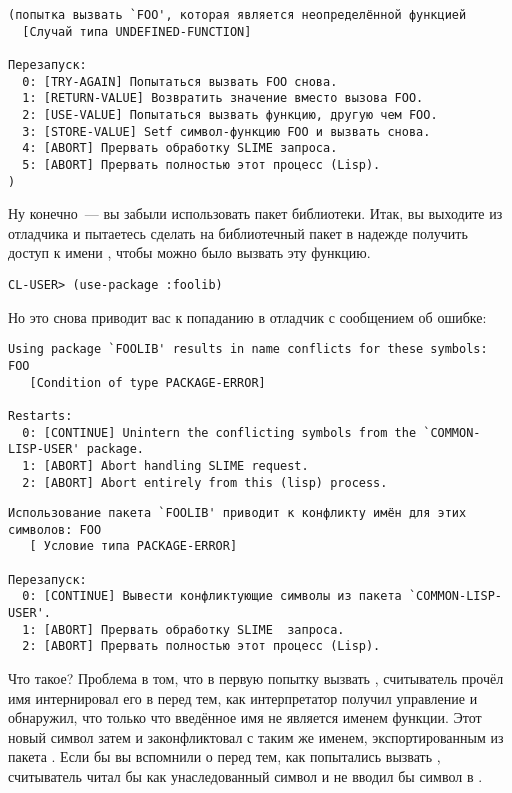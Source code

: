 \begin{verbatim}
(попытка вызвать `FOO', которая является неопределённой функцией
  [Случай типа UNDEFINED-FUNCTION]

Перезапуск:
  0: [TRY-AGAIN] Попытаться вызвать FOO снова.
  1: [RETURN-VALUE] Возвратить значение вместо вызова FOO.
  2: [USE-VALUE] Попытаться вызвать функцию, другую чем FOO.
  3: [STORE-VALUE] Setf символ-функцию FOO и вызвать снова.
  4: [ABORT] Прервать обработку SLIME запроса.
  5: [ABORT] Прервать полностью этот процесс (Lisp).
)
\end{verbatim}

Ну конечно~--- вы забыли использовать пакет библиотеки. Итак, вы выходите из отладчика и
пытаетесь сделать  на библиотечный пакет в надежде получить доступ к
имени , чтобы можно было вызвать эту функцию.

\begin{lstlisting}
CL-USER> (use-package :foolib)
\end{lstlisting}

Но это снова приводит вас к попаданию в отладчик с сообщением об ошибке:

\begin{lstlisting}
Using package `FOOLIB' results in name conflicts for these symbols: FOO
   [Condition of type PACKAGE-ERROR]

Restarts:
  0: [CONTINUE] Unintern the conflicting symbols from the `COMMON-LISP-USER' package.
  1: [ABORT] Abort handling SLIME request.
  2: [ABORT] Abort entirely from this (lisp) process.
\end{lstlisting}

\begin{verbatim}
Использование пакета `FOOLIB' приводит к конфликту имён для этих символов: FOO
   [ Условие типа PACKAGE-ERROR]

Перезапуск:
  0: [CONTINUE] Вывести конфликтующие символы из пакета `COMMON-LISP-USER'.
  1: [ABORT] Прервать обработку SLIME  запроса.
  2: [ABORT] Прервать полностью этот процесс (Lisp).
\end{verbatim}

Что такое? Проблема в том, что в первую попытку вызвать , считыватель прочёл имя
 интернировал его в  перед тем, как интерпретатор получил
управление и обнаружил, что только что введённое имя не является именем функции. Этот
новый символ затем и законфликтовал с таким же именем, экспортированным из пакета
. Если бы вы вспомнили о  перед тем, как попытались
вызвать , считыватель читал бы  как унаследованный символ и не вводил
бы  символ в .

